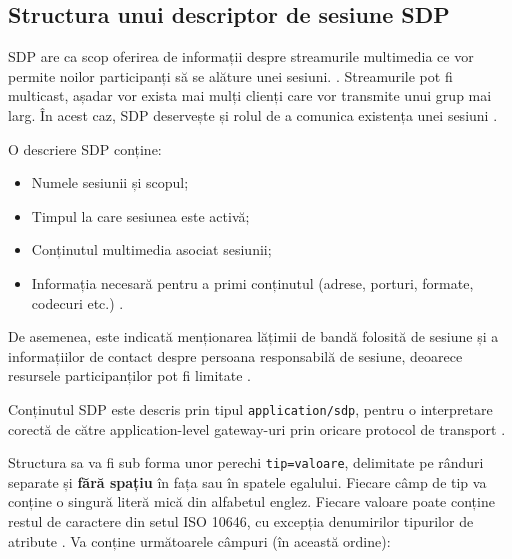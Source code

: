 \subsection{Structura unui descriptor de sesiune SDP}
\indent \par SDP are ca scop oferirea de informații despre streamurile multimedia ce vor permite noilor participanți să se alăture unei sesiuni. \cite{rfc4566}. Streamurile pot fi multicast, așadar vor exista mai mulți clienți care vor transmite unui grup mai larg. În acest caz, SDP deservește și rolul de a comunica existența unei sesiuni \cite{rfc4566}.
\indent \par O descriere SDP conține:
\begin{itemize}
    \item Numele sesiunii și scopul;
    \item Timpul la care sesiunea este activă;
    \item Conținutul multimedia asociat sesiunii;
    \item Informația necesară pentru a primi conținutul (adrese, porturi, formate, codecuri etc.) \cite{rfc4566}.
\end{itemize}
\indent \par De asemenea, este indicată menționarea lățimii de bandă folosită de sesiune și a informațiilor de contact despre persoana responsabilă de sesiune, deoarece resursele participanților pot fi limitate \cite{rfc4566}.
\indent \par Conținutul SDP este descris prin tipul \texttt{application/sdp}, pentru o interpretare corectă de către application-level gateway-uri prin oricare protocol de transport \cite{rfc4566}.
\indent \par Structura sa va fi sub forma unor perechi \texttt{tip=valoare}, delimitate pe rânduri separate și \textbf{fără spațiu} în fața sau în spatele egalului. Fiecare câmp de tip va conține o singură literă mică din alfabetul englez. Fiecare valoare poate conține restul de caractere din setul ISO 10646, cu excepția denumirilor tipurilor de atribute \cite{rfc4566}. Va conține următoarele câmpuri (în această ordine):
